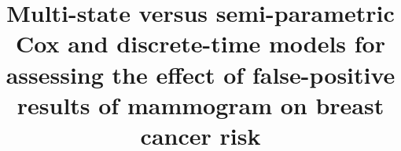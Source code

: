 \documentclass{bmcart}
\begin{document}
\begin{frontmatter}

\begin{fmbox}


\title{Multi-state versus semi-parametric Cox and discrete-time models for assessing the effect of
       false-positive results of mammogram on breast cancer risk}


\author[
   addressref={aff1,aff2},                   %
   email={jblanchifont@gmail.com}   %
]{ }
\author[
   addressref={aff3, aff4,aff5},
   email={geskus.work@inter.nl.net}
]{ }
\author[
   addressref={aff1, aff6, aff7},
   email={mariasalaserra@parcdesalutmar.cat}
]{ }
\author[
   addressref={aff1, aff6, aff7},
   email={xaviercastells@parcdesalutmar.cat}
]{ }
\author[
   addressref={aff8},
   corref={aff8},                       %
   email={montse.rue@cmb.udl.cat}
]{ }



\end{fmbox}
\end{frontmatter}
\end{document}
